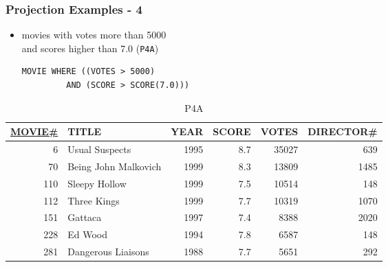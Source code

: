 \documentclass[dvipsnames]{beamer}
\theoremstyle{plain}
\begin{document}
\begin{frame}[fragile]
  \frametitle{Projection Examples - 4}

  \begin{itemize}
    \item movies with votes more than 5000\\
      and scores higher than 7.0 (\texttt{P4A})
    \begin{lstlisting}
MOVIE WHERE ((VOTES > 5000)
         AND (SCORE > SCORE(7.0)))
    \end{lstlisting}
  \end{itemize}

  \vspace{-10pt}
  \begin{tiny}
  \begin{table}
    \caption{P4A}
    \begin{tabular}{|r|l|r|r|r|r|}\hline
\underline{MOVIE\#} & TITLE & YEAR & SCORE & VOTES & DIRECTOR\#\\[2pt]\hline\hline
   6 & Usual Suspects       & 1995 &   8.7 & 35027 &        639\\\hline
  70 & Being John Malkovich & 1999 &   8.3 & 13809 &       1485\\\hline
 110 & Sleepy Hollow        & 1999 &   7.5 & 10514 &        148\\\hline
 112 & Three Kings          & 1999 &   7.7 & 10319 &       1070\\\hline
 151 & Gattaca              & 1997 &   7.4 &  8388 &       2020\\\hline
 228 & Ed Wood              & 1994 &   7.8 &  6587 &        148\\\hline
 281 & Dangerous Liaisons   & 1988 &   7.7 &  5651 &        292\\\hline
    \end{tabular}
  \end{table}
  \end{tiny}
\end{frame}
\end{document}

